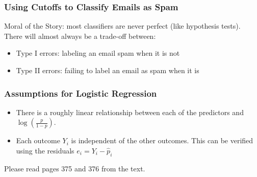 \documentclass[handout]{beamer}
\newcommand{\blue}[1]{\textcolor{blue2}{#1}}
\begin{document}
\begin{frame}[fragile]
\frametitle{Using Cutoffs to Classify Emails as Spam}

%
%
\blue{Moral of the Story}:  most classifiers are never perfect (like hypothesis tests).  There will almost always be a trade-off between:  
\begin{itemize}
\item Type I errors:  labeling an email spam when it is not
\item Type II errors:  failing to label an email as spam when it is 
\end{itemize}

\end{frame}


\begin{frame}[fragile]
\frametitle{Assumptions for Logistic Regression}

%
%
\begin{itemize}
\item There is a roughly linear relationship between each of the predictors and $\log\left(\frac{p}{1-p}\right)$.
\pause\item Each outcome $Y_i$ is independent of the other outcomes.  This can be verified using the residuals $e_i = Y_i - \widehat{p}_i$
\end{itemize}

\pause Please read pages 375 and 376 from the text.  

\end{frame}
\end{document}
